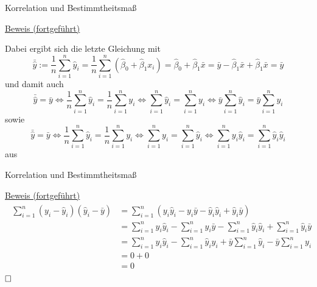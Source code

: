 \documentclass[
  8pt,
  ignorenonframetext,
]{beamer}
\begin{document}
\begin{frame}{Korrelation und Bestimmtheitsmaß}
\protect\hypertarget{korrelation-und-bestimmtheitsmauxdf-6}{}
\footnotesize

\underline{Beweis (fortgeführt)}

Dabei ergibt sich die letzte Gleichung mit \begin{equation}
\bar{\hat{y}}
:= \frac{1}{n}\sum_{i=1}^n \hat{y}_i
= \frac{1}{n}\sum_{i=1}^n(\hat{\beta}_0 + \hat{\beta}_1x_i)
= \hat{\beta}_0 + \hat{\beta}_1\bar{x}
= \bar{y} - \hat{\beta}_1\bar{x} + \hat{\beta}_1\bar{x}
= \bar{y}
\end{equation} und damit auch \begin{equation}
\bar{\hat{y}} = \bar{y}
\Leftrightarrow
\frac{1}{n}\sum_{i=1}^n\hat{y}_i = \frac{1}{n}\sum_{i=1}^n y_i
\Leftrightarrow
\sum_{i=1}^n\hat{y}_i = \sum_{i=1}^n y_i
\Leftrightarrow
\bar{y}\sum_{i=1}^n\hat{y}_i = \bar{y}\sum_{i=1}^n y_i
\end{equation} sowie \begin{equation}
\bar{\hat{y}} = \bar{y}
\Leftrightarrow
\frac{1}{n}\sum_{i=1}^n\hat{y}_i = \frac{1}{n}\sum_{i=1}^n y_i
\Leftrightarrow
\sum_{i=1}^n y_i = \sum_{i=1}^n\hat{y}_i
\Leftrightarrow
\sum_{i=1}^n y_i \hat{y}_i = \sum_{i=1}^n\hat{y}_i\hat{y}_i
\end{equation} aus
\end{frame}

\begin{frame}{Korrelation und Bestimmtheitsmaß}
\protect\hypertarget{korrelation-und-bestimmtheitsmauxdf-7}{}
\footnotesize

\underline{Beweis (fortgeführt)} \begin{align}
\begin{split}
\sum_{i=1}^n(y_i - \hat{y}_i)(\hat{y}_i - \bar{y})
& = \sum_{i=1}^n (y_i\hat{y}_i - y_i\bar{y} - \hat{y}_i\hat{y}_i + \hat{y}_i\bar{y}) \\
& = \sum_{i=1}^n y_i\hat{y}_i - \sum_{i=1}^n y_i\bar{y} - \sum_{i=1}^n \hat{y}_i\hat{y}_i + \sum_{i=1}^n \hat{y}_i\bar{y} \\
& = \sum_{i=1}^n y_i\hat{y}_i - \sum_{i=1}^n \hat{y}_i\hat{y}_i + \bar{y}\sum_{i=1}^n \hat{y}_i - \bar{y}\sum_{i=1}^n y_i \\
& = 0 + 0 \\
& = 0
\end{split}
\end{align} \(\hfill\Box\)
\end{frame}
\end{document}
